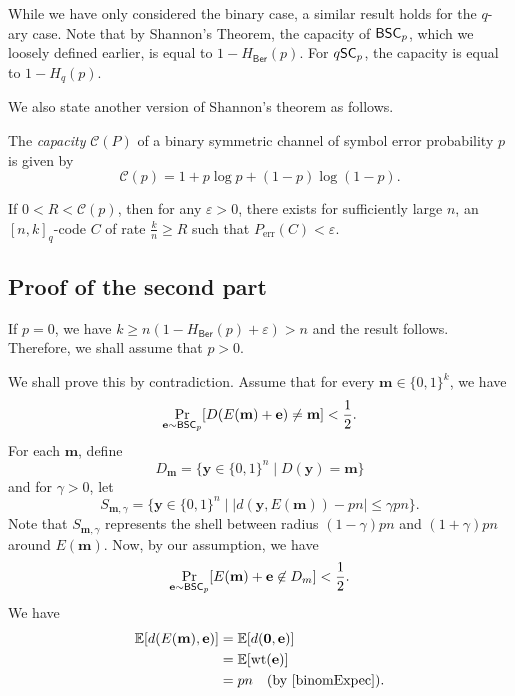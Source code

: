 While we have only considered the binary case, a similar result holds for the $q$-ary case. Note that by Shannon's Theorem, the capacity of $\mathsf{BSC}_p$, which we loosely defined earlier, is equal to $1-H_\mathsf{Ber}(p)$. For $q\mathsf{SC}_p$, the capacity is equal to $1-H_q(p)$.

\vspace{2mm}
We also state another version of Shannon's theorem as follows.

\begin{theorem*}
    The \textit{capacity} $\mathscr{C}(P)$ of a binary symmetric channel of symbol error probability $p$ is given by
    $$\mathscr{C}(p)=1+p\log p+(1-p)\log(1-p).$$

    If $0<R<\mathscr{C}(p)$, then for any $\varepsilon>0$, there exists for sufficiently large $n$, an $[n,k]_q$-code $C$ of rate $\frac{k}{n}\geq R$ such that $P_\text{err}(C)<\varepsilon$.
\end{theorem*}

\begin{center}
\end{center}


\subsection{Proof of the second part}

If $p=0$, we have $k\geq n(1-H_\mathsf{Ber}(p)+\varepsilon)>n$ and the result follows. Therefore, we shall assume that $p>0$.

We shall prove this by contradiction. Assume that for every $\textbf{m}\in\{0,1\}^k$, we have
$$\Pr_{\textbf{e}\sim\mathsf{BSC}_p}[D(E(\textbf{m})+\textbf{e})\neq \textbf{m}]<\frac{1}{2}.$$
For each $\textbf{m}$, define
$$D_\textbf{m}=\{\textbf{y}\in\{0,1\}^n\mid D(\textbf{y})=\textbf{m}\}$$
and for $\gamma>0$, let
$$S_{\textbf{m},\gamma}=\{\textbf{y}\in\{0,1\}^n\mid |d(\textbf{y}, E(\textbf{m}))-pn|\leq\gamma pn\}.$$
Note that $S_{\textbf{m},\gamma}$ represents the shell between radius $(1-\gamma)pn$ and $(1+\gamma)pn$ around $E(\textbf{m})$. Now, by our assumption, we have
$$\Pr_{\textbf{e}\sim\mathsf{BSC}_p}[E(\textbf{m})+\textbf{e}\not\in D_{m}]<\frac{1}{2}.$$
We have
\begin{align*}
    \mathbb{E}[d(E(\textbf{m}),\textbf{e})] &= \mathbb{E}[d(\textbf{0}, \textbf{e})] \\
            &= \mathbb{E}[\operatorname{wt}(\textbf{e})] \\
            &= pn\quad\text{(by \ref{binomExpec})}.
\end{align*}

